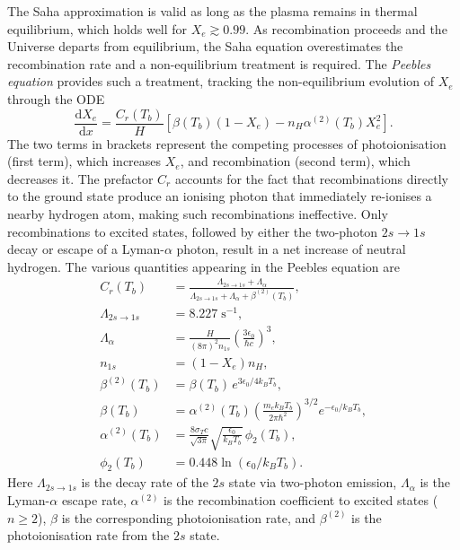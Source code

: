 \documentclass[twocolumn]{aa}
\begin{document}
The Saha approximation is valid as long as the plasma remains in thermal equilibrium, which holds well for $X_e \gtrsim 0.99$. As recombination proceeds and the Universe departs from equilibrium, the Saha equation overestimates the recombination rate and a non-equilibrium treatment is required. The \textit{Peebles equation} \citep{peebles} provides such a treatment, tracking the non-equilibrium evolution of $X_e$ through the ODE
\begin{equation*}
      \frac{\mathrm{d}X_e}{\mathrm{d}x} = \frac{C_r(T_b)}{H} \left[\beta(T_b)(1-X_e) - n_H \alpha^{(2)}(T_b)X_e^2\right]. \label{eq:Peebles}
\end{equation*}
The two terms in brackets represent the competing processes of photoionisation (first term), which increases $X_e$, and recombination (second term), which decreases it. The prefactor $C_r$ accounts for the fact that recombinations directly to the ground state produce an ionising photon that immediately re-ionises a nearby hydrogen atom, making such recombinations ineffective. Only recombinations to excited states, followed by either the two-photon $2s\rightarrow 1s$ decay or escape of a Lyman-$\alpha$ photon, result in a net increase of neutral hydrogen. The various quantities appearing in the Peebles equation are
\begin{align*}
      C_r(T_b) &= \frac{\Lambda_{2s\rightarrow1s} + \Lambda_{\alpha}}{\Lambda_{2s\rightarrow1s} + \Lambda_{\alpha} + \beta^{(2)}(T_b)},\\
      \Lambda_{2s\rightarrow1s} &= 8.227 \;\mathrm{s}^{-1},\\
      \Lambda_{\alpha} &= \frac{H}{(8\pi)^2 n_{1s}}\left(\frac{3\epsilon_0}{\hbar c}\right)^3,\\
      n_{1s} &= (1-X_e)n_H,\\
      \beta^{(2)}(T_b) &= \beta(T_b)\, e^{3\epsilon_0/4k_BT_b},\\
      \beta(T_b) &= \alpha^{(2)}(T_b) \left(\frac{m_ek_BT_b}{2\pi\hbar^2}\right)^{3/2} e^{-\epsilon_0/k_BT_b},\\
      \alpha^{(2)}(T_b) &= \frac{8\sigma_T c}{\sqrt{3\pi}}\sqrt{\frac{\epsilon_0}{k_BT_b}}\,\phi_2(T_b),\\
      \phi_2(T_b) &= 0.448\ln\!\left(\epsilon_0/k_BT_b\right).
\end{align*}
Here $\Lambda_{2s\rightarrow1s}$ is the decay rate of the $2s$ state via two-photon emission, $\Lambda_\alpha$ is the Lyman-$\alpha$ escape rate, $\alpha^{(2)}$ is the recombination coefficient to excited states ($n\geq 2$), $\beta$ is the corresponding photoionisation rate, and $\beta^{(2)}$ is the photoionisation rate from the $2s$ state. 
\end{document}
